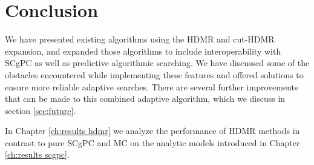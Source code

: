 \section{Conclusion}
We have presented existing algorithms using the HDMR and cut-HDMR expansion, and expanded those algorithms to
include interoperability with SCgPC as well as predictive algorithmic searching.  We have discussed some of
the obstacles encountered while implementing these features and offered solutions to ensure more reliable
adaptive searches.
There are several further improvements that can be made to this combined adaptive algorithm, which we discuss
in section \ref{sec:future}.

In Chapter \ref{ch:results hdmr} we analyze the performance of HDMR methods in contrast to pure SCgPC and MC
on the analytic models introduced in Chapter \ref{ch:results scgpc}.
